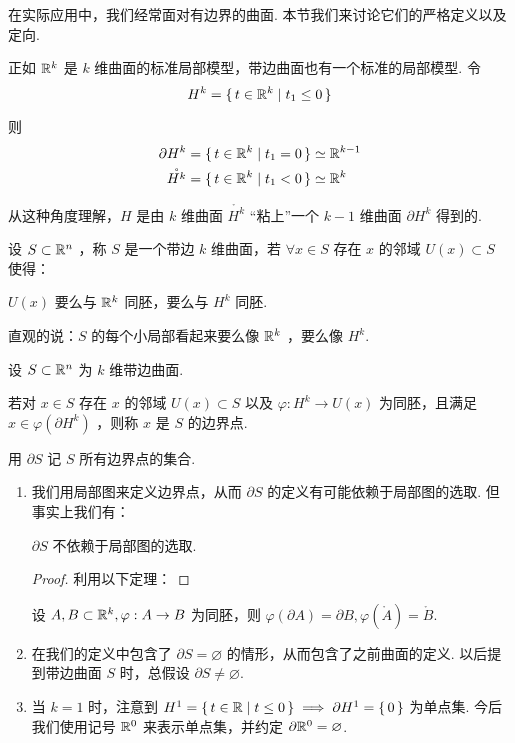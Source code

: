 在实际应用中，我们经常面对有边界的曲面. 本节我们来讨论它们的严格定义以及定向.



正如 $\mathbb{R}^k$ 是 $k$ 维曲面的标准局部模型，带边曲面也有一个标准的局部模型. 令
$$
H^k=\set{t\in\mathbb{R}^k|t_1\le 0}
$$


则
$$
\begin{aligned}
\partial H^k&=\set{t\in\mathbb{R}^k|t_1=0}\simeq\mathbb{R}^{k-1}\\
\mathring{H^k}&=\set{t\in\mathbb{R}^k|t_1<0}\simeq\mathbb{R}^k
\end{aligned}
$$

从这种角度理解，$H$ 是由 $k$ 维曲面 $\mathring{H^k}$ “粘上”一个 $k-1$ 维曲面 $\partial H^k$ 得到的.

\begin{definition}
设 $S\subset\mathbb{R}^n$ ，称 $S$ 是一个带边 $k$ 维曲面，若 $\forall x\in S$ 存在 $x$ 的邻域 $U(x)\subset S$ 使得：

$U(x)$ 要么与 $\mathbb{R}^k$ 同胚，要么与 $H^k$ 同胚.
\end{definition}

直观的说：$S$ 的每个小局部看起来要么像 $\mathbb{R}^k$ ，要么像 $H^k$.

\begin{definition}
设 $S\subset\mathbb{R}^n$ 为 $k$ 维带边曲面.

若对 $x\in S$ 存在 $x$ 的邻域 $U(x)\subset S$ 以及 $\varphi:H^k\to U(x)$ 为同胚，且满足 $x\in\varphi(\partial H^k)$ ，则称 $x$ 是 $S$ 的边界点.

用 $\partial S$ 记 $S$ 所有边界点的集合.
\end{definition}

\begin{hint}
\begin{enumerate}
    \item 我们用局部图来定义边界点，从而 $\partial S$ 的定义有可能依赖于局部图的选取. 但事实上我们有：
    
    \begin{property}
        $\partial S$ 不依赖于局部图的选取.
    \end{property}
    \begin{proof}
        利用以下定理：
    \end{proof}

    \begin{theorem}[Brouwer 定理]
        设 $A,B\subset\mathbb{R}^k,\varphi:A\to B$ 为同胚，则 $\varphi(\partial A)=\partial B,\varphi(\mathring{A})=\mathring{B}$.
    \end{theorem}

    \item 在我们的定义中包含了 $\partial S=\varnothing$ 的情形，从而包含了之前曲面的定义. 以后提到带边曲面 $S$ 时，总假设 $\partial S\ne\varnothing$.
    
    \item 当 $k=1$ 时，注意到 $H^1=\set{t\in\mathbb{R}|t\le 0}\implies \partial H^1=\set{0}$ 为单点集. 今后我们使用记号 $\mathbb{R}^0$ 来表示单点集，并约定 $\partial\mathbb{R}^0=\varnothing$.
\end{enumerate}
\end{hint}

